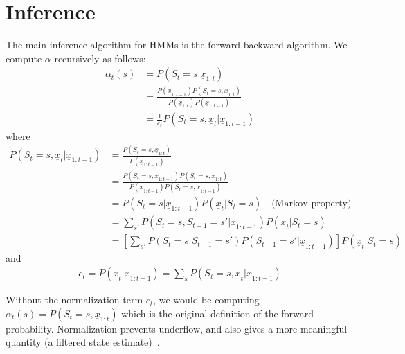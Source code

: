 \section{Inference}\label{sec:hmm-infernece}
The main inference algorithm for HMMs is the forward-backward algorithm. We
compute $\alpha$ recursively as follows:
\begin{align}
\alpha_t(s) &= P(S_t=s|\underline{x}_{1:t}) \\
            &= \frac{P(\underline{x}_{1:t-1})P(S_t=s,
            \underline{x}_{1:t})}{P(\underline{x}_{1:t})P(\underline{x}_{1:t-1})}\\
            &= \frac{1}{c_t}P(S_t=s,
\underline{x}_t|\underline{x}_{1:t-1})
\end{align}
where
\begin{align*}
P(S_t=s,\underline{x}_t|\underline{x}_{1:t-1}) &=
\frac{P(S_t=s,\underline{x}_{1:t})}{P(\underline{x}_{1:t-1})} \\
&=
\frac{P(S_t=s,\underline{x}_{1:t-1})P(S_t=s,\underline{x}_{1:t})}{P(\underline{x}_{1:t-1})P(S_t=s,\underline{x}_{1:t-1})}\\
&= P(S_t=s|\underline{x}_{1:t-1})P(\underline{x}_t|S_t=s) \quad \text{(Markov
property)}\\
&= \sum_{s'}P(S_t=s, S_{t-1}=s'|\underline{x}_{1:t-1})P(\underline{x}_t|S_t=s)
\\
&= \left[\sum_{s'}P(S_t=s |
S_{t-1}=s')P(S_{t-1}=s'|\underline{x}_{1:t-1})\right] P(\underline{x}_t|S_t=s)
\end{align*}
and
\begin{align*}
c_t=P(\underline{x}_t|\underline{x}_{1:t-1})=\sum_s P(S_t=s,
\underline{x}_t|\underline{x}_{1:t-1})
\end{align*}

Without the normalization term $c_t$, we would be computing
$\alpha_t(s)=P(S_t=s, \underline{x}_{1:t})$ which is the original definition of
the forward probability. Normalization prevents underflow, and also gives a more
meaningful quantity (a filtered state estimate)~\cite{murphy02}.
